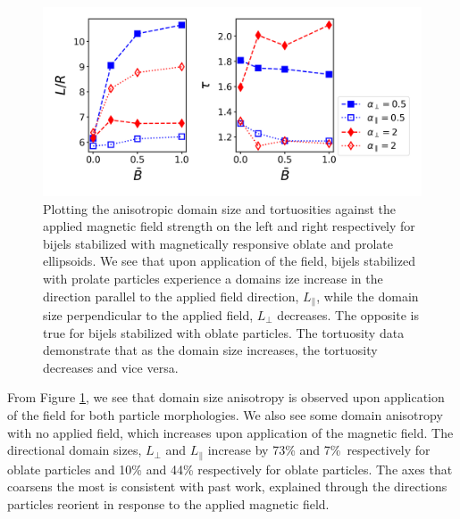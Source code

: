 \begin{figure} 
\centering 
\includegraphics[scale=0.5]{../figures/results/paper2/domain_size_aniso-field_on.png} 
\caption{Plotting the anisotropic domain size and tortuosities against the applied magnetic field strength on the left and right respectively for bijels 
         stabilized with magnetically responsive oblate and prolate ellipsoids. We see that upon application of the field, bijels stabilized with prolate 
         particles experience a domains ize increase in the direction parallel to the applied field direction, $L_{\parallel}$, while the domain size 
         perpendicular to the applied field, $L_{\perp}$ decreases. The opposite is true for bijels stabilized with oblate particles. The tortuosity data 
         demonstrate that as the domain size increases, the tortuosity decreases and vice versa.} 
\label{fig:domain_size_aniso-field_on} 
\end{figure}

From Figure \ref{fig:domain_size_aniso-field_on}, we see that domain size anisotropy is observed upon application of the field for both
particle morphologies. We also see some domain anisotropy with no applied field, which increases upon application of the magnetic field.
The directional domain sizes, $L_{\perp}$ and $L_{\parallel}$ increase by 73\% and 7\%\ respectively for oblate particles and
10\% and 44\% respectively for oblate particles. The axes that coarsens the most is consistent with past work, explained through the
directions particles reorient in response to the applied magnetic field.

